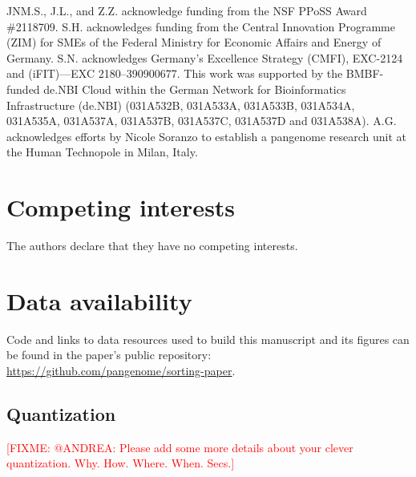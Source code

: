 \documentclass{bioinfo}
\theoremstyle{definition}
\newcommand{\red}[1]{{\textcolor{Red}{#1}}}
\newcommand{\FIXME}[1]{\red{[FIXME: #1]}}
\begin{document}
JNM.S., J.L., and Z.Z. acknowledge funding from the NSF PPoSS Award \#2118709.
S.H. acknowledges funding from the Central Innovation Programme (ZIM) for SMEs of the Federal Ministry for Economic Affairs and Energy of Germany.
S.N. acknowledges Germany’s Excellence Strategy (CMFI), EXC-2124 and (iFIT)—EXC 2180–390900677.
This work was supported by the BMBF-funded de.NBI Cloud within the German Network for Bioinformatics Infrastructure (de.NBI) (031A532B, 031A533A, 031A533B, 031A534A, 031A535A, 031A537A, 031A537B, 031A537C, 031A537D and 031A538A).
A.G. acknowledges efforts by Nicole Soranzo to establish a pangenome research unit at the Human Technopole in Milan, Italy.

\section*{Competing interests}
The authors declare that they have no competing interests.

\section*{Data availability}

Code and links to data resources used to build this manuscript and its figures can be found in the paper's public repository: \url{https://github.com/pangenome/sorting-paper}.





\begin{appendices}
	\section{Quantization}
	\FIXME{@ANDREA: Please add some more details about your clever quantization. Why. How. Where. When. Secs.}
\end{appendices}
\end{document}
